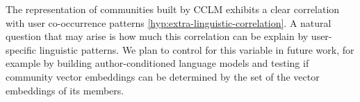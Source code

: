 \documentclass[11pt,a4paper]{article}
\begin{document}
The representation of communities built by CCLM exhibits a clear
correlation with user co-occurrence patterns
\ref{hyp:extra-linguistic-correlation}. A natural
question that may arise is how much this correlation can be explain by
user-specific linguistic patterns. We plan to control for this variable
in future work, for example by building author-conditioned language
models and testing if community vector embeddings can be determined by
the set of the vector embeddings of its members.



\end{document}
